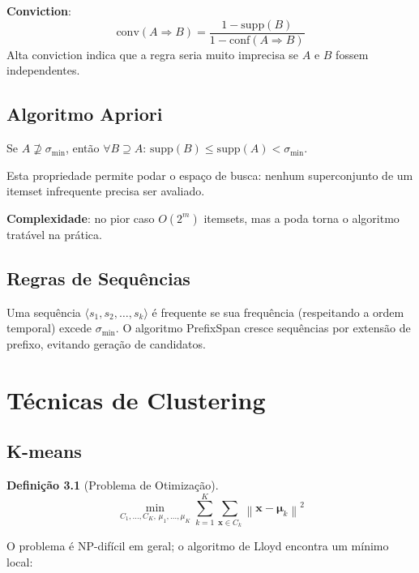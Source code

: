 \documentclass[12pt,a4paper,twoside]{book}
\theoremstyle{definition}
\newtheorem{definicao}{Definição}[chapter]
\theoremstyle{remark}
\newcommand{\bx}{\bm{x}}
\newcommand{\norm}[1]{\left\|#1\right\|}
\begin{document}
\textbf{Conviction}:
\[
\mathrm{conv}(A \Rightarrow B) = \frac{1 - \mathrm{supp}(B)}{1 - \mathrm{conf}(A \Rightarrow B)}
\]
Alta conviction indica que a regra seria muito imprecisa se $A$ e $B$ fossem independentes.

\section{Algoritmo Apriori}

\begin{tcolorbox}[defbox,title=Propriedade Anti-monotônica (Apriori)]
Se $A \not\supseteq \sigma_{\min}$, então $\forall B \supseteq A$: $\mathrm{supp}(B) \leq \mathrm{supp}(A) < \sigma_{\min}$.
\end{tcolorbox}

Esta propriedade permite podar o espaço de busca: nenhum superconjunto de um itemset infrequente precisa ser avaliado.

\textbf{Complexidade}: no pior caso $O(2^m)$ itemsets, mas a poda torna o algoritmo tratável na prática.

\section{Regras de Sequências}

Uma sequência $\langle s_1, s_2, \ldots, s_k \rangle$ é frequente se sua frequência (respeitando a ordem temporal) excede $\sigma_{\min}$. O algoritmo PrefixSpan cresce sequências por extensão de prefixo, evitando geração de candidatos.

\chapter{Técnicas de Clustering}

\section{K-means}

\begin{definicao}[Problema de Otimização]
\[
\min_{C_1,\ldots,C_K,\, \mu_1,\ldots,\mu_K} \sum_{k=1}^K \sum_{\bx \in C_k} \norm{\bx - \bm{\mu}_k}^2
\]
\end{definicao}

O problema é NP-difícil em geral; o algoritmo de Lloyd encontra um mínimo local:
\end{document}
